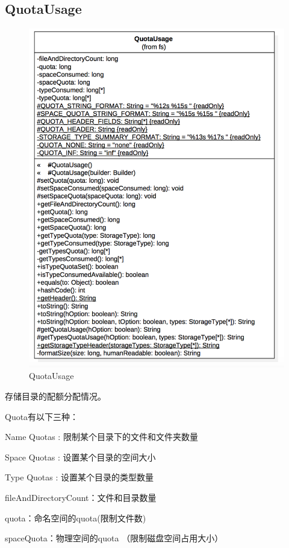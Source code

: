 \subsection{QuotaUsage}

\begin{figure}
\centering
\includegraphics[width =1\linewidth]{uml/outputstream/8.png}
\caption{QuotaUsage}
\label{fig:QuotaUsage}
\end{figure}

存储目录的配额分配情况。

Quota有以下三种：

Name Quotas : 限制某个目录下的文件和文件夹数量

Space Quotas : 设置某个目录的空间大小

Type Quotas : 设置某个目录的类型数量

fileAndDirectoryCount：文件和目录数量

quota：命名空间的quota(限制文件数)

spaceQuota：物理空间的quota （限制磁盘空间占用大小）

